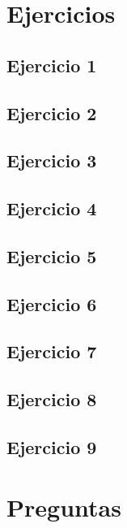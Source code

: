 \documentclass{aitemplate}
\begin{document}
\section{Ejercicios}\subsection*{Ejercicio 1}
\newpage\subsection*{Ejercicio 2}
\newpage\subsection*{Ejercicio 3}
\newpage\subsection*{Ejercicio 4}
\newpage\subsection*{Ejercicio 5}
\newpage\subsection*{Ejercicio 6}
\newpage\subsection*{Ejercicio 7}
\newpage\subsection*{Ejercicio 8}
\newpage\subsection*{Ejercicio 9}
\newpage\section{Preguntas}
\end{document}
